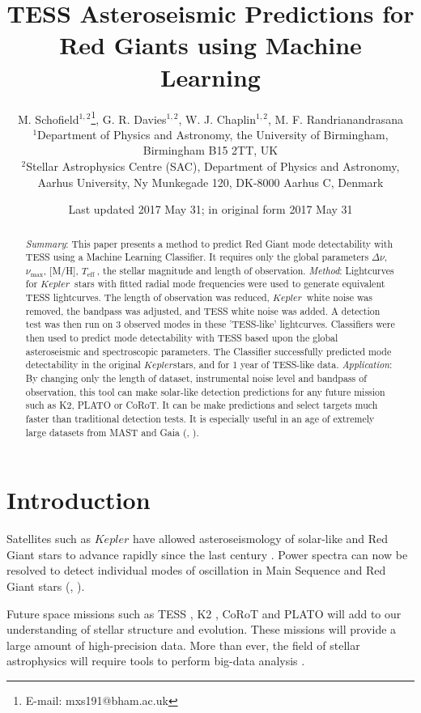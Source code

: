 \documentclass[a4paper,fleqn,usenatbib,useAMS]{mnras}
\title[TRG]{TESS Asteroseismic Predictions for Red Giants using Machine Learning}
\author[M. Schofield et al.]{M. Schofield$^{1, 2}$\thanks{E-mail: mxs191@bham.ac.uk}, G. R. Davies$^{1, 2}$, W. J. Chaplin$^{1, 2}$, M. F. Randrianandrasana
\\
$^{1}$Department of Physics and Astronomy, the University of Birmingham, Birmingham B15 2TT, UK \\
$^{2}$Stellar Astrophysics Centre (SAC), Department of Physics and Astronomy, Aarhus University, Ny Munkegade 120, DK-8000 Aarhus C, Denmark}
\date{Last updated 2017 May 31; in original form 2017 May 31}
\newcommand{\numax}{\ensuremath{\nu_{\textrm{max}}}}
\newcommand{\dnu}{\ensuremath{\Delta\nu}}
\newcommand{\teff}{\ensuremath{T_{\textrm{eff}}\:}}
\newcommand{\kep}{\ensuremath{Kepler}\:}
\begin{document}
\label{firstpage}
\pagerange{\pageref{firstpage}--\pageref{lastpage}}
\maketitle

\begin{abstract}
{\it Summary}: This paper presents a method to predict Red Giant mode detectability with TESS using a Machine Learning Classifier. It requires only the global parameters \dnu, \numax, [M/H], \teff, the stellar magnitude and length of observation. \newline
{\it Method}: Lightcurves for \kep \ stars with fitted radial mode frequencies were used to generate equivalent TESS lightcurves. The length of observation was reduced, \kep \ white noise was removed, the bandpass was adjusted, and TESS white noise was added. A detection test was then run on 3 observed modes in these 'TESS-like' lightcurves. Classifiers were then used to predict mode detectability with TESS based upon the global asteroseismic and spectroscopic parameters. The Classifier successfully predicted mode detectability in the original \kep stars, and for 1 year of TESS-like data.\newline
{\it Application}: By changing only the length of dataset, instrumental noise level and bandpass of observation, this tool can make solar-like detection predictions for any future mission such as K2, PLATO or CoRoT. It can be make predictions and select targets much faster than traditional detection tests. It is especially useful in an age of extremely large datasets from MAST and Gaia (\citet{eisenstein_sdss-iii:_2011}, \citet{gaia_collaboration_gaia_2016}).
\end{abstract}


\section{Introduction}

Satellites such as $Kepler$ have allowed asteroseismology of solar-like and Red Giant stars to advance rapidly since the last century \citet{chaplin_asteroseismology_2013}. Power spectra can now be resolved to detect individual modes of oscillation in Main Sequence and Red Giant stars (\citet{lund_standing_2017}, \citet{davies_asteroseismology_2016}).

Future space missions such as TESS \citep{ricker_transiting_2014}, K2 \citep{howell_k2_2014}, CoRoT \citep{baglin_corot:_2006} and PLATO \citep{rauer_plato_2014} will add to our understanding of stellar structure and evolution. These missions will provide a large amount of high-precision data. More than ever, the field of stellar astrophysics will require tools to perform big-data analysis \citep{kremer_big_2017}. 
\end{document}
